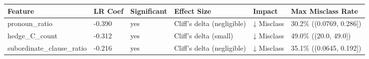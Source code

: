 \begin{tabular}{llllll}
\toprule
Feature & LR Coef & Significant & Effect Size & Impact & Max Misclass Rate \\
\midrule
pronoun\_ratio & -0.390 & yes & Cliff's delta (negligible) & ↓ Misclass & 30.2\% ((0.0769, 0.286]) \\
hedge\_C\_count & -0.312 & yes & Cliff's delta (small) & ↓ Misclass & 49.0\% ((20.0, 49.0]) \\
subordinate\_clause\_ratio & -0.216 & yes & Cliff's delta (negligible) & ↓ Misclass & 35.1\% ((0.0645, 0.192]) \\
\bottomrule
\end{tabular}
